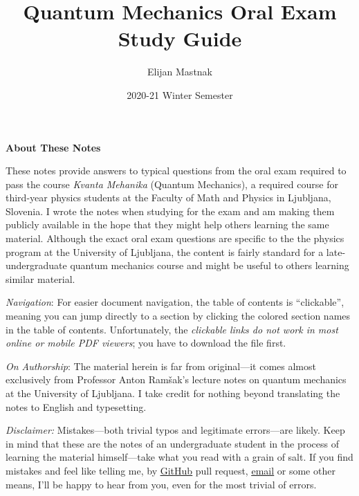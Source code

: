 \documentclass[11pt, a4paper]{article}
\begin{document}
\title{Quantum Mechanics Oral Exam Study Guide}
\author{Elijan Mastnak}
\date{2020-21 Winter Semester}
\maketitle

\thispagestyle{empty}  %

\begin{center}
\textbf{About These Notes}
\end{center}
These notes provide answers to typical questions from the oral exam required to pass the course \textit{Kvanta Mehanika} (Quantum Mechanics), a required course for third-year physics students at the Faculty of Math and Physics in Ljubljana, Slovenia. I wrote the notes when studying for the exam and am making them publicly available in the hope that they might help others learning the same material. Although the exact oral exam questions are specific to the the physics program at the University of Ljubljana, the content is fairly standard for a late-undergraduate quantum mechanics course and might be useful to others learning similar material. %

\vspace{2mm}
\textit{Navigation}: For easier document navigation, the table of contents is ``clickable'', meaning you can jump directly to a section by clicking the colored section names in the table of contents. Unfortunately, the \textit{clickable links do not work in most online or mobile PDF viewers}; you have to download the file first.

\vspace{2mm}
\textit{On Authorship}: The material herein is far from original---it comes almost exclusively from Professor Anton Ram\v{s}ak's lecture notes on quantum mechanics at the University of Ljubljana. I take credit for nothing beyond translating the notes to English and typesetting.

\vspace{2mm}
\textit{Disclaimer:} Mistakes---both trivial typos and legitimate errors---are likely. Keep in mind that these are the notes of an undergraduate student in the process of learning the material himself---take what you read with a grain of salt. If you find mistakes and feel like telling me, by \href{https://github.com/ejmastnak/fmf}{\underline{GitHub}} pull request, \href{mailto:ejmastnak@gmail.com}{\underline{email}} or some other means, I'll be happy to hear from you, even for the most trivial of errors.
\end{document}
